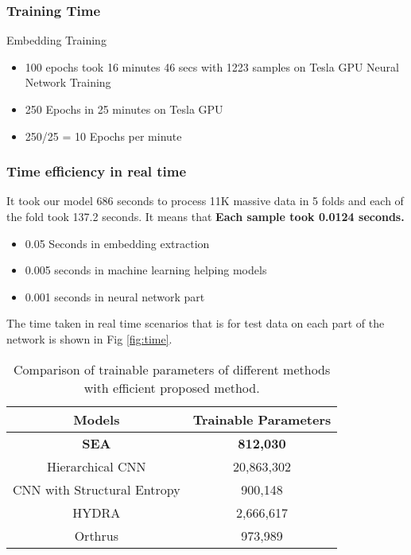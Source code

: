 \documentclass[conference]{IEEEtran}
\begin{document}
\subsubsection{Training Time}
Embedding Training
\begin{itemize}
    \item 100 epochs took 16 minutes 46 secs with 1223 samples on Tesla GPU Neural Network Training
    \item 250 Epochs in 25 minutes on Tesla GPU
    \item 250/25 = 10 Epochs per minute
\end{itemize}
\subsubsection{Time efficiency in real time}
It took our model 686 seconds to process 11K massive data in 5 folds and each of the fold took 137.2 seconds. It means that \textbf{Each sample took 0.0124 seconds.}\\
\begin{itemize}
    \item 0.05 Seconds in embedding extraction
    \item 0.005 seconds in machine learning helping models
    \item 0.001 seconds in neural network part
\end{itemize}
The time taken in real time scenarios that is for test data on each part of the network is shown in Fig \ref{fig:time}.

\begin{table*}[htbp]
\caption{Comparison of trainable parameters of different methods with efficient proposed method.}
\begin{center}
\begin{tabular}{|c|c|}
\hline
\textbf{Models}&{\textbf{Trainable Parameters}} \\

\hline
\textbf{SEA} &\textbf{812,030}  \\
\hline
\hline
Hierarchical CNN \cite{b5}&20,863,302   \\
\hline
\hline
CNN with Structural Entropy \cite{b6} &900,148 \\ 
\hline
\hline
HYDRA \cite{b3}&2,666,617  \\
\hline
\hline
Orthrus \cite{b4}&973,989  \\
\hline
\hline

\end{tabular}
\label{tab2}
\end{center}
\end{table*}
\end{document}

